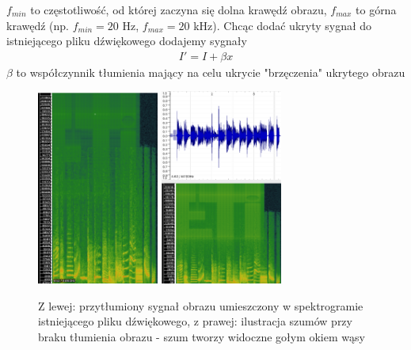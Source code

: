 \documentclass{article}
\begin{document}
 $f_{min}$ to częstotliwość, od której zaczyna
się dolna krawędź obrazu, $f_{max}$ to górna krawędź (np. $f_{min} = 20$ Hz, $f_{max} = 20$ kHz).
Chcąc dodać ukryty sygnał do istniejącego pliku dźwiękowego dodajemy sygnały
\begin{gather*}
I' = I + \beta x
\end{gather*}
$\beta$ to współczynnik tłumienia mający na celu ukrycie "brzęczenia" ukrytego obrazu
\begin{figure}[H]
	\centering
	\includegraphics[width=4cm]{gorszajakosc_spektro}
	\includegraphics[width=4cm]{szumy_spektro}
	\caption{Z lewej: przytłumiony sygnał obrazu umieszczony w spektrogramie istniejącego pliku dźwiękowego, z prawej: ilustracja szumów przy braku tłumienia obrazu - szum tworzy widoczne gołym okiem wąsy}
\end{figure}
\end{document}
